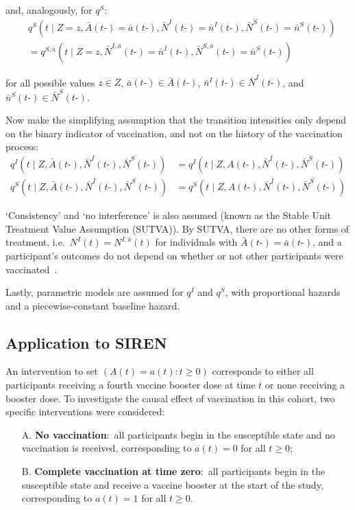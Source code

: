 and, analogously, for $q^{S}$:
%
\begin{align*}
     & q^S (t \mid Z = z, \bar{A} (t \mbox{-}) = \bar{a} (t \mbox{-}), \bar{N}^I (t \mbox{-}) = \bar{n}^I (t \mbox{-}), \bar{N}^S (t \mbox{-}) = \bar{n}^S (t \mbox{-})) \\
     & = q^{S, \bar{a}} (t \mid Z = z, \bar{N}^{I, \bar{a}} (t \mbox{-}) = \bar{n}^I (t \mbox{-}), \bar{N}^{S, \bar{a}} (t \mbox{-}) = \bar{n}^S (t \mbox{-}))
\end{align*}

for all possible values $z \in Z$, $\bar{a} (t \mbox{-}) \in \bar{A}(t\mbox{-})$, $\bar{n}^I (t \mbox{-}) \in \bar{N}^I (t \mbox{-})$, and $\bar{n}^S (t \mbox{-}) \in \bar{N}^S (t \mbox{-})$.

Now make the simplifying assumption that the transition intensities only depend on the binary indicator of vaccination, and not on the history of the vaccination process:
%
\begin{align*}
    q^I (t \mid Z, \bar{A} (t \mbox{-}), \bar{N}^I (t \mbox{-}), \bar{N}^S (t \mbox{-})) & =
    q^I (t \mid Z, A(t \mbox{-}), \bar{N}^I (t \mbox{-}), \bar{N}^S (t \mbox{-}))            \\
    q^S (t \mid Z, \bar{A} (t \mbox{-}), \bar{N}^I (t \mbox{-}), \bar{N}^S (t \mbox{-})) & =
    q^S (t \mid Z, A(t \mbox{-}), \bar{N}^I (t \mbox{-}), \bar{N}^S (t \mbox{-}))
\end{align*}

`Consistency' and `no interference' is also assumed (known as the Stable Unit Treatment Value Assumption (SUTVA)). By SUTVA, there are no other forms of treatment, i.e.\ $N^I(t) = N^{I, \bar{a}}(t)$ for individuals with $\bar{A}(t\mbox{-}) = \bar{a}(t\mbox{-})$, and a participant's outcomes do not depend on whether or not other participants were vaccinated~\parencite{VanderWeele2013-iw}.

Lastly, parametric models are assumed for $q^I$ and $q^S$, with proportional hazards and a piecewise-constant baseline hazard.

\subsection{Application to SIREN}

An intervention to set $\left(A(t) = a(t): t \geq 0\right)$ corresponds to either all participants receiving a fourth vaccine booster dose at time $t$ or none receiving a booster dose. To investigate the causal effect of vaccination in this cohort, two specific interventions were considered:
%
\begin{enumerate}
    \item[A.] \textbf{No vaccination}:\ all participants begin in the susceptible state and no vaccination is received, corresponding to $a(t) = 0$ for all $t \geq 0$;
    \item[B.] \textbf{Complete vaccination at time zero}:\ all participants begin in the susceptible state and receive a vaccine booster at the start of the study, corresponding to $a(t) = 1$ for all $t \geq 0$.
\end{enumerate}

